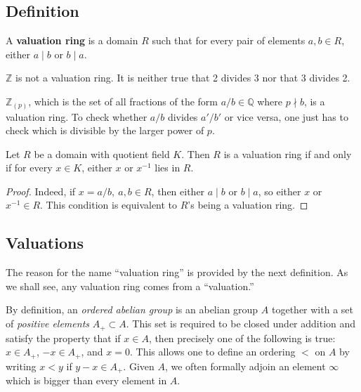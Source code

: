 \subsection{Definition}

\begin{definition} 
A \textbf{valuation ring} is a domain $R$ such that for every pair of elements
$a,b \in R$, either $a \mid b$ or $b \mid a$. 
\end{definition} 

\begin{example} 
$\mathbb{Z}$ is not a valuation ring. It is neither true that  2 divides 3
nor that 3 divides 2.
\end{example} 

\begin{example} 
$\mathbb{Z}_{(p)}$, which is the set of all fractions of the form $a/b \in
\mathbb{Q}$ where $p \nmid b$, is a valuation ring. To check whether $a/b$
divides $a'/b'$ or vice versa, one  just has to check which is divisible by
the larger power of $p$. 
\end{example} 

\begin{proposition} 
Let $R$ be a domain with quotient field $K$. Then $R$ is a valuation ring if
and only if for every $x \in K$, either $x$ or $x^{-1}$ lies in $R$.
\end{proposition} 

\begin{proof} Indeed, if $x=a/b , \ a,b \in R$, then either $a \mid
b$ or $b \mid a$, so either $x$ or $x^{-1} \in R$. This condition is equivalent
to $R$'s being a valuation ring.
\end{proof}


\subsection{Valuations}
The reason for the name ``valuation ring'' is provided by the next definition.
As we shall see, any valuation ring comes from a ``valuation.''

By definition, an \emph{ordered abelian group} is an abelian group $A$
together with a set of \emph{positive elements} $A_+ \subset A$. This set is
required to be closed under addition and satisfy the property that if $x \in
A$, then precisely one of the following is true: $x \in A_+$, $-x \in A_+$,
and $x = 0$. This allows one to define an ordering $<$ on $A$ by writing $x<y$
if $y-x \in A_+$.
Given $A$, we often formally adjoin an element $\infty$ which is bigger than
every element in $A$. 


